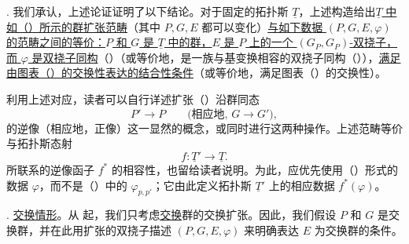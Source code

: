 
. 我们承认，上述论证证明了以下结论。对于固定的拓扑斯 $\underline T$，上述构造给出\underline{$\underline T$ 中如（）所示的群扩张范畴}（其中 $P,G,E$ 都可以变化）\underline{与如下数据 $(P,G,E,\varphi)$ 的范畴之间的等价：$P$ 和 $G$ 是 $\underline T$ 中的群，$E$ 是 $P$ 上的一个 $(G_P,G_P)$-双挠子，而 $\varphi$ 是双挠子同构}（）（或等价地，是一族与基变换相容的双挠子同构（）），\underline{满足由图表（）的交换性表达的结合性条件}（或等价地，满足图表（）的交换性）。

利用上述对应，读者可以自行详述扩张（）沿群同态
\[
 P'\longrightarrow P
 \qquad\bigl(\text{相应地, }G\longrightarrow G'\bigr),
\]
的逆像（相应地，正像）这一显然的概念，或同时进行这两种操作。上述范畴等价与拓扑斯态射
\[
 f:\underline T'\longrightarrow\underline T.
\]
所联系的逆像函子 $f^*$ 的相容性，也留给读者说明。为此，应优先使用（）形式的数据 $\varphi$，而不是（）中的 $\varphi_{p,p'}$；它由此定义拓扑斯 $\underline T'$ 上的相应数据 $f^*(\varphi)$。




. \underline{交换情形}。从  起，我们只考虑\underline{交换}群的交换扩张。因此，我们假设 $P$ 和 $G$ 是交换群，并在此用扩张的双挠子描述 $(P,G,E,\varphi)$ 来明确表达 $E$ 为交换群的条件。


